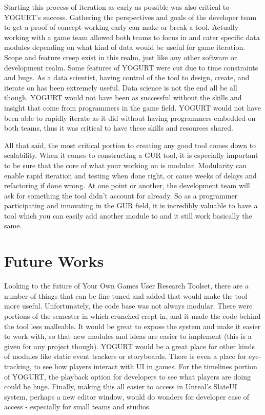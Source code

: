 \documentclass[journal]{IEEEtran}
\begin{document}
Starting this process of iteration as early as possible was also critical to YOGURT's success. Gathering the perspectives and goals of the developer team to get a proof of concept working early can make or break a tool. Actually working with a game team allowed both teams to focus in and cater specific data modules depending on what kind of data would be useful for game iteration. Scope and feature creep exist in this realm, just like any other software or development realm. Some features of YOGURT were cut due to time constraints and bugs. As a data scientist, having control of the tool to design, create, and iterate on has been extremely useful. Data science is not the end all be all though. YOGURT would not have been as successful without the skills and insight that come from programmers in the game field. YOGURT would not have been able to rapidly iterate as it did without having programmers embedded on both teams, thus it was critical to have these skills and resources shared.

All that said, the most critical portion to creating any good tool comes down to scalability. When it comes to constructing a GUR tool, it is especially important to be sure that the core of what your working on is modular. Modularity can enable rapid iteration and testing when done right, or cause weeks of delays and refactoring if done wrong. At one point or another, the development team will ask for something the tool didn't account for already. So as a programmer participating and innovating in the GUR field, it is incredibly valuable to have a tool which you can easily add another module to and it still work basically the same.

\section{Future Works}

Looking to the future of Your Own Games User Research Toolset, there are a number of things that can be fine tuned and added that would make the tool more useful. Unfortunately, the code base was not always modular. There were portions of the semester in which crunched crept in, and it made the code behind the tool less malleable. It would be great to expose the system and make it easier to work with, so that new modules and ideas are easier to implement (this is a given for any project though). YOGURT would be a great place for other kinds of modules like static event trackers or storyboards. There is even a place for eye-tracking, to see how players interact with UI in games. For the timelines portion of YOGURT, the playback option for developers to see what players are doing could be huge. Finally, making this all easier to access in Unreal’s SlateUI system, perhaps a new editor window, would do wonders for developer ease of access - especially for small teams and studios.
\end{document}
